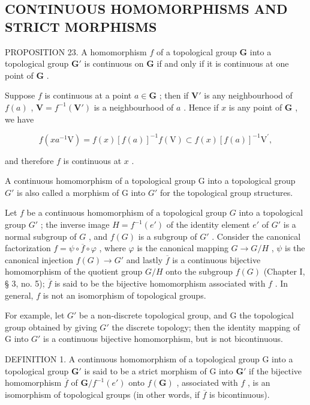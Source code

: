 \subsection{CONTINUOUS HOMOMORPHISMS AND STRICT MORPHISMS}

PROPOSITION 23. A homomorphism \(f\) of a topological group \(\mathbf{G}\) into a topological group \(\mathbf{G}'\) is continuous on \(\mathbf{G}\) if and only if it is continuous at one point of \(\mathbf{G}\) .

Suppose \(f\) is continuous at a point \(a \in \mathbf{G}\) ; then if \(\mathbf{V}'\) is any neighbourhood of \(f(a)\) , \(\mathbf{V} = f^{-1}(\mathbf{V}')\) is a neighbourhood of \(a\) . Hence if \(x\) is any point of \(\mathbf{G}\) , we have

\[
f (x a ^ {- 1} \mathrm{V}) = f (x) [ f (a) ] ^ {- 1} f (\mathrm{V}) \subset f (x) [ f (a) ] ^ {- 1} \mathrm{V} ^ {\prime},
\]

and therefore \(f\) is continuous at \(x\) .

A continuous homomorphism of a topological group G into a topological group \(G'\) is also called a morphism of G into \(G'\) for the topological group structures.

Let \(f\) be a continuous homomorphism of a topological group \(G\) into a topological group \(G'\) ; the inverse image \(H = f^{-1}(e')\) of the identity element \(e'\) of \(G'\) is a normal subgroup of \(G\) , and \(f(G)\) is a subgroup of \(G'\) . Consider the canonical factorization \(f = \psi \circ \overline{f} \circ \varphi\) , where \(\varphi\) is the canonical mapping \(G \to G/H\) , \(\psi\) is the canonical injection \(f(G) \to G'\) and lastly \(\overline{f}\) is a continuous bijective homomorphism of the quotient group \(G/H\) onto the subgroup \(f(G)\) (Chapter I, § 3, no. 5); \(\overline{f}\) is said to be the bijective homomorphism associated with \(f\) . In general, \(f\) is not an isomorphism of topological groups.

For example, let \(G'\) be a non-discrete topological group, and G the topological group obtained by giving \(G'\) the discrete topology; then the identity mapping of G into \(G'\) is a continuous bijective homomorphism, but is not bicontinuous.

DEFINITION 1. A continuous homomorphism of a topological group G into a topological group \(\mathbf{G}'\) is said to be a strict morphism of G into \(\mathbf{G}'\) if the bijective homomorphism \(\overline{f}\) of \(\mathbf{G}/f^{-1}(e')\) onto \(f(\mathbf{G})\) , associated with \(f\) , is an isomorphism of topological groups (in other words, if \(\overline{f}\) is bicontinuous).

